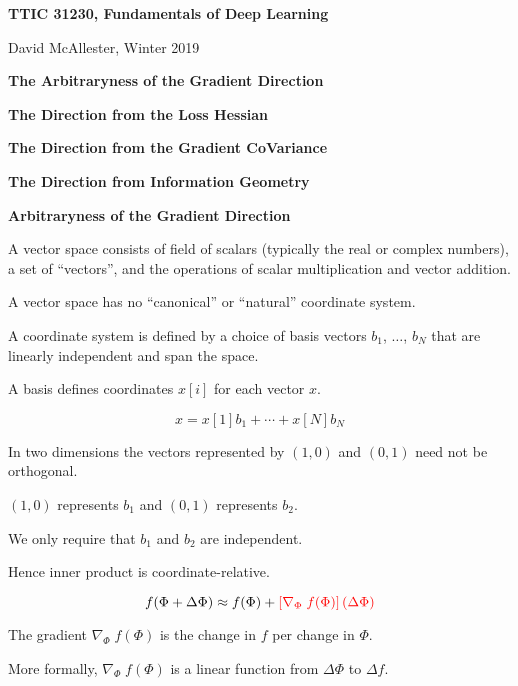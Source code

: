 





{\Huge
  \centerline{\bf TTIC 31230, Fundamentals of Deep Learning}
  \bigskip
  \centerline{David McAllester, Winter 2019}
  \vfill
  \centerline{\bf The Arbitraryness of the Gradient Direction}
  \vfill
  \centerline{\bf The Direction from the Loss Hessian}
  \vfill
  \centerline{\bf The Direction from the Gradient CoVariance}
  \vfill
  \centerline{\bf The Direction from Information Geometry}

\slide{}
\centerline{\bf Arbitraryness of the Gradient Direction}

\vfill


A vector space consists of field of scalars (typically the real or complex numbers), a set of ``vectors'', and the operations of scalar multiplication and vector addition.

\vfill
A vector space has no ``canonical'' or ``natural'' coordinate system.

\vfill
A coordinate system is defined by a choice of basis vectors $b_1$, $\ldots$, $b_N$
that are linearly independent and span the space.

\vfill
A basis defines coordinates $x[i]$ for each vector $x$.

$$x = x[1]b_1 + \cdots + x[N] b_N$$


\vfill
In two dimensions the vectors represented by $(1,0)$ and $(0,1)$ need not be orthogonal.

\vfill
$(1,0)$ represents $b_1$ and $(0,1)$ represents $b_2$.

\vfill
We only require that $b_1$ and $b_2$ are independent.

\vfill
Hence inner product is coordinate-relative.



$$f(\Phi + \Delta\Phi) \approx f(\Phi) + {\color{red} \left[\nabla_\Phi \;f(\Phi)\right](\Delta \Phi)}$$


The gradient $\nabla_\Phi \; f(\Phi)$ is the change in $f$ per change in $\Phi$.

\vfill
More formally, $\nabla_\Phi\; f(\Phi)$ is a linear function from $\Delta \Phi$ to $\Delta f$.

}
